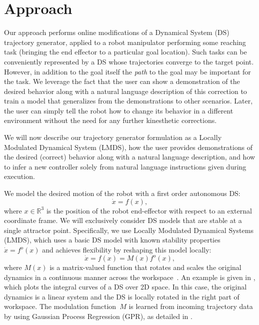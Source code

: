 
\section{Approach}
\label{sec:approach}

Our approach performs online modifications of a Dynamical System (DS) trajectory generator, applied to a robot manipulator performing some reaching task (bringing the end effector to a particular goal location).
Such tasks can be conveniently represented by a DS whose trajectories converge to the target point.
However, in addition to the goal itself the \emph{path} to the goal may be important for the task.
We leverage the fact that the user can show a demonstration of the desired behavior along with a natural language description of this correction to train a model that generalizes from the demonstrations to other scenarios.
Later, the user can simply tell the robot how to change its behavior in a different environment without the need for any further kinesthetic corrections.

We will now describe our trajectory generator formulation as a Locally Modulated Dynamical System (LMDS), how the user provides demonstrations of the desired (correct) behavior along with a natural language description, and how to infer a new controller solely from natural language instructions given during execution.


We model the desired motion of the robot with a first order autonomous DS:
\begin{equation}
  \label{eq:DS_general}
  \dot x = f(x),
\end{equation}
where $x \in \mathbb{R}^3$ is the position of the robot end-effector with respect to an external coordinate frame.
We will exclusively consider DS models that are stable at a single attractor point.
Specifically, we use Locally Modulated Dynamical Systems (LMDS), which uses a basic DS model with known stability properties $\dot x = f^o(x)$ and achieves flexibility by reshaping this model locally:
\begin{equation}
  \label{eq:DS_reshaped}
  \dot x = f(x) = M(x)f^o(x),
\end{equation}
where $M(x)$ is a matrix-valued function that rotates and scales the original dynamics in a continuous manner across the workspace~\cite{Kronander2015}.
An example is given in , which plots the integral curves of a DS over 2D space.
In this case, the original dynamics is a linear system and the DS is locally rotated in the right part of workspace.
The modulation function~$M$ is learned from incoming trajectory data by using Gaussian Process Regression (GPR), as detailed in \cite{Kronander2015}.

